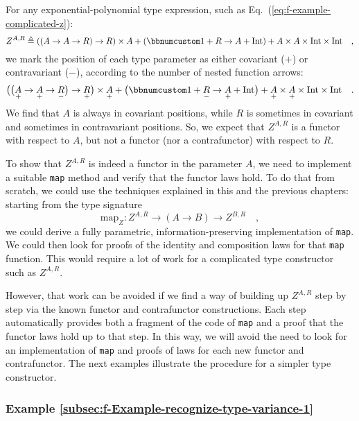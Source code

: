 For any exponential-polynomial type expression, such as Eq.~(\ref{eq:f-example-complicated-z}):
\[
Z^{A,R}\triangleq\left(\left(A\rightarrow A\rightarrow R\right)\rightarrow R\right)\times A+\left(\bbnum 1+R\rightarrow A+\text{Int}\right)+A\times A\times\text{Int}\times\text{Int}\quad,
\]
we mark the position of each type parameter as either covariant ($+$)
or contravariant ($-$), according to the number of nested function
arrows:
\[
\big(\big(\underset{+}{A}\rightarrow\underset{+}{A}\rightarrow\underset{-}{R}\big)\rightarrow\underset{+}{R}\big)\times\underset{+}{A}+\big(\bbnum 1+\underset{-}{R}\rightarrow\underset{+}{A}+\text{Int}\big)+\underset{+}{A}\times\underset{+}{A}\times\text{Int}\times\text{Int}\quad.
\]
We find that $A$ is always in covariant positions, while $R$ is
sometimes in covariant and sometimes in contravariant positions. So,
we expect that $Z^{A,R}$ is a functor with respect to $A$, but not
a functor (nor a contrafunctor) with respect to $R$.

To show that $Z^{A,R}$ is indeed a functor in the parameter $A$,
we need to implement a suitable \lstinline!map! method and verify
that the functor laws hold. To do that from scratch, we could use
the techniques explained in this and the previous chapters: starting
from the type signature
\[
\text{map}_{Z}:Z^{A,R}\rightarrow\left(A\rightarrow B\right)\rightarrow Z^{B,R}\quad,
\]
we could derive a fully parametric, information-preserving implementation
of \lstinline!map!. We could then look for proofs of the identity
and composition laws for that \lstinline!map! function. This would
require a lot of work for a complicated type constructor such as $Z^{A,R}$.

However, that work can be avoided if we find a way of building up
$Z^{A,R}$ step by step via the known functor and contrafunctor constructions.
Each step automatically provides both a fragment of the code of \lstinline!map!
and a proof that the functor laws hold up to that step. In this way,
we will avoid the need to look for an implementation of \lstinline!map!
and proofs of laws for each new functor and contrafunctor. The next
examples illustrate the procedure for a simpler type constructor.

\subsubsection{Example \label{subsec:f-Example-recognize-type-variance-1}\ref{subsec:f-Example-recognize-type-variance-1}}

